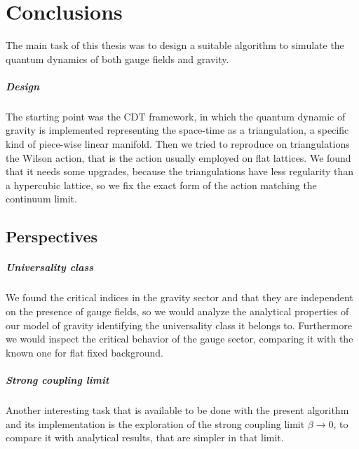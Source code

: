 
\cleardoublepage
{}

\chapter*{Conclusions}
%
	{}

The main task of this thesis was to design a suitable algorithm to simulate the quantum dynamics of both gauge fields and gravity.

\paragraph{Design} The starting point was the CDT framework, in which the quantum dynamic of gravity is implemented representing the space-time as a triangulation, a specific kind of piece-wise linear manifold.
Then we tried to reproduce on triangulations the Wilson action, that is the action usually employed on flat lattices. We found that it needs some upgrades, because the triangulations have less regularity than a hypercubic lattice, so we fix the exact form of the action matching the continuum limit.


\section*{Perspectives}
\label{sec:perspectives}

\paragraph{Universality class} We found the critical indices in the gravity sector and that they are independent on the presence of gauge fields, so we would analyze the analytical properties of our model of gravity identifying the universality class it belongs to.
Furthermore we would inspect the critical behavior of the gauge sector, comparing it with the known one for flat fixed background.

\paragraph{Strong coupling limit} Another interesting task that is available to be done with the present algorithm and its implementation is the exploration of the strong coupling limit $ \beta \rightarrow 0 $, to compare it with analytical results, that are simpler in that limit.

